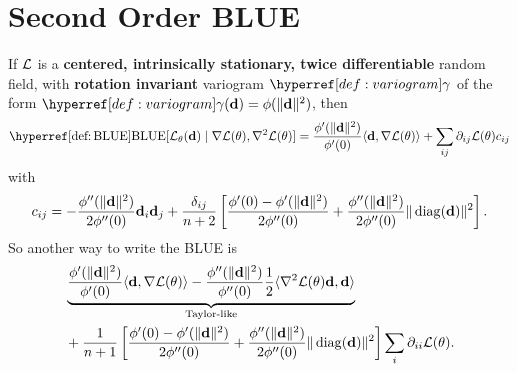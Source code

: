 \section{Second Order BLUE}

\begin{lemma}
	If \(\mathcal{L}\) is a \textbf{centered, intrinsically stationary, twice
	differentiable} random field, with \textbf{rotation invariant} variogram
	\(\variogram\) of the form \(\variogram(\step)=\phi(\|\step\|^2)\), then
	\begin{equation*}
		\BLUE[\Loss_\param(\step)\mid \grad\Loss(\param), \hessian\Loss(\param)]
		= \frac{\phi'(\|\step\|^2)}{\phi'(0)}\langle \step, \grad\Loss(\param)\rangle
		+ \sum_{ij}\partial_{ij}\Loss(\param)c_{ij}
	\end{equation*}
	with
	\begin{equation*}
		c_{ij} =
			- \frac{\phi''(\|\mathbf{d}\|^2)}{2\phi''(0)}\mathbf{d}_i\mathbf{d}_j
			+ \frac{\delta_{ij}}{n+2}\left[
				\frac{\phi'(0) - \phi'(\|\mathbf{d}\|^2)}{2\phi''(0)}
				+ \frac{\phi''(\|\mathbf{d}\|^2)}{2\phi''(0)}\|\operatorname{diag}(\mathbf{d})\|^2
			\right].
	\end{equation*}
	So another way to write the BLUE is
	\begin{equation*}
	\begin{aligned}
		&\underbrace{
			\frac{\phi'(\|\mathbf{d}\|^2)}{\phi'(0)}\langle \mathbf{d}, \nabla\mathcal{L}(\theta)\rangle
			- \frac{\phi''(\|\mathbf{d}\|^2)}{\phi''(0)} \frac12\langle \nabla^2\mathcal{L}(\theta)\mathbf{d}, \mathbf{d}\rangle
		}_{\text{Taylor-like}}\\
		&+ \frac{1}{n+1}\left[
				\frac{\phi'(0) - \phi'(\|\mathbf{d}\|^2)}{2\phi''(0)}
				+ \frac{\phi''(\|\mathbf{d}\|^2)}{2\phi''(0)}\|\operatorname{diag}(\mathbf{d})\|^2
		\right]
		\sum_{i} \partial_{ii}\mathcal{L}(\theta).
	\end{aligned}
	\end{equation*}
\end{lemma}

